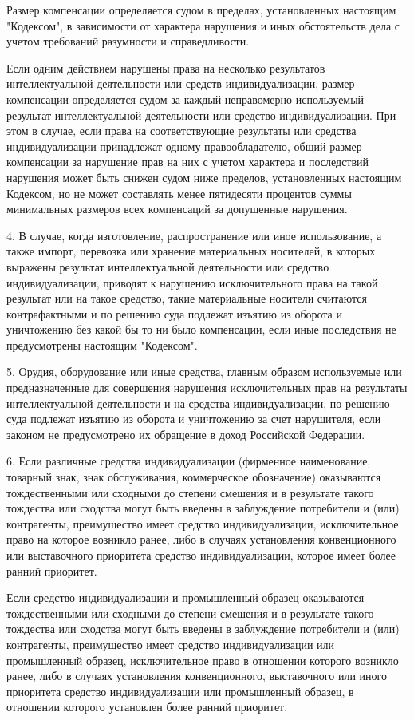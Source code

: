  Размер компенсации определяется судом в пределах, установленных настоящим "Кодексом", в зависимости от характера нарушения и иных обстоятельств дела с учетом требований разумности и справедливости.
  
  Если одним действием нарушены права на несколько результатов интеллектуальной деятельности или средств индивидуализации, размер компенсации определяется судом за каждый неправомерно используемый результат интеллектуальной деятельности или средство индивидуализации. При этом в случае, если права на соответствующие результаты или средства индивидуализации принадлежат одному правообладателю, общий размер компенсации за нарушение прав на них с учетом характера и последствий нарушения может быть снижен судом ниже пределов, установленных настоящим Кодексом, но не может составлять менее пятидесяти процентов суммы минимальных размеров всех компенсаций за допущенные нарушения.

4. В случае, когда изготовление, распространение или иное использование, а также импорт, перевозка или хранение материальных носителей, в которых выражены результат интеллектуальной деятельности или средство индивидуализации, приводят к нарушению исключительного права на такой результат или на такое средство, такие материальные носители считаются контрафактными и по решению суда подлежат изъятию из оборота и уничтожению без какой бы то ни было компенсации, если иные последствия не предусмотрены настоящим "Кодексом".
 
 5. Орудия, оборудование или иные средства, главным образом используемые или предназначенные для совершения нарушения исключительных прав на результаты интеллектуальной деятельности и на средства индивидуализации, по решению суда подлежат изъятию из оборота и уничтожению за счет нарушителя, если законом не предусмотрено их обращение в доход Российской Федерации.

 6. Если различные средства индивидуализации (фирменное наименование, товарный знак, знак обслуживания, коммерческое обозначение) оказываются тождественными или сходными до степени смешения и в результате такого тождества или сходства могут быть введены в заблуждение потребители и (или) контрагенты, преимущество имеет средство индивидуализации, исключительное право на которое возникло ранее, либо в случаях установления конвенционного или выставочного приоритета средство индивидуализации, которое имеет более ранний приоритет.
  
  Если средство индивидуализации и промышленный образец оказываются тождественными или сходными до степени смешения и в результате такого тождества или сходства могут быть введены в заблуждение потребители и (или) контрагенты, преимущество имеет средство индивидуализации или промышленный образец, исключительное право в отношении которого возникло ранее, либо в случаях установления конвенционного, выставочного или иного приоритета средство индивидуализации или промышленный образец, в отношении которого установлен более ранний приоритет.
   
